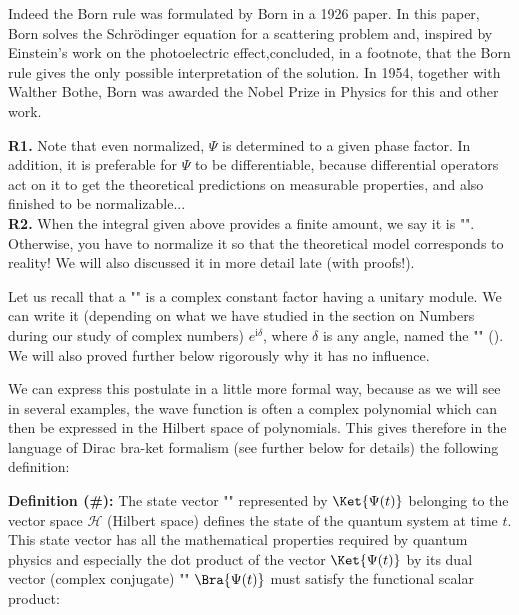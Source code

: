 	Indeed the Born rule was formulated by Born in a 1926 paper. In this paper, Born solves the Schrödinger equation for a scattering problem and, inspired by Einstein's work on the photoelectric effect,concluded, in a footnote, that the Born rule gives the only possible interpretation of the solution. In 1954, together with Walther Bothe, Born was awarded the Nobel Prize in Physics for this and other work.
	\begin{tcolorbox}[title=Remark,colframe=black,arc=10pt]
	\textbf{R1.} Note that even normalized, $\Psi$ is determined to a given phase factor. In addition, it is preferable for $\Psi$ to be differentiable, because differential operators act on it to get the theoretical predictions on measurable properties, and also finished to be normalizable...\\
	
	\textbf{R2.} When the integral given above provides a finite amount, we say it is "". Otherwise, you have to normalize it so that the theoretical model corresponds to reality! We will also discussed it in more detail late (with proofs!). 
	\end{tcolorbox}
	
	Let us recall that a "" is a complex constant factor having a unitary module. We can write it (depending on what we have studied in the section on Numbers during our study of complex numbers) $e^{\mathrm{i}\delta}$, where $\delta$ is any angle, named the "" (). We will also proved further below rigorously why it has no influence.
	
	We can express this postulate in a little more formal way, because as we will see in several examples, the wave function is often a complex polynomial which can then be expressed in the Hilbert space of polynomials. This gives therefore in the language of Dirac bra-ket formalism (see further below for details) the following definition:
	
	\textbf{Definition (\#\mydef):} The state vector "" represented by $\Ket{\Psi(t)}$ belonging to the vector space $\mathcal{H}$ (Hilbert space) defines the state of the quantum system at time $t$. This state vector has all the mathematical properties required by quantum physics and especially the dot product of the vector $\Ket{\Psi(t)}$ by its dual vector (complex conjugate) "" $\Bra{\Psi(t)}$ must satisfy the functional scalar product:
	
